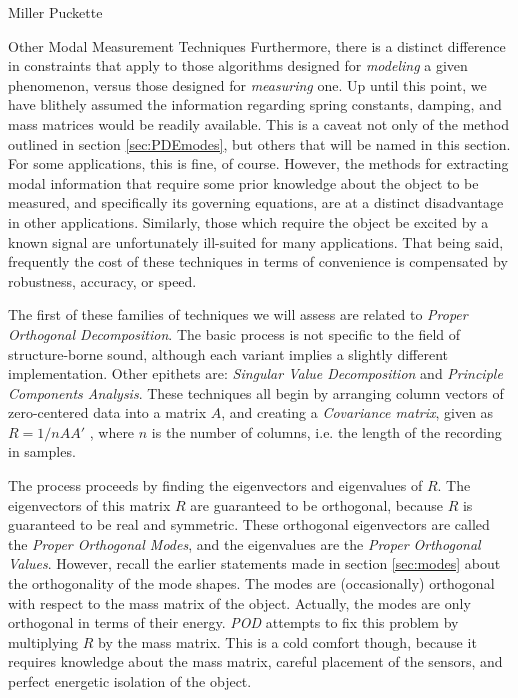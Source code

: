 \documentclass[a4paper,10pt]{report}
\numberwithin{equation}{section}
\begin{document}
\begin{chapter}{Miller Puckette}
\begin{section}{Other Modal Measurement Techniques}
Furthermore, there is a distinct difference in constraints that apply to those algorithms designed for \emph{modeling} a given phenomenon, versus those designed for \emph{measuring} one. Up until this point, we have blithely assumed the information regarding spring constants, damping, and mass matrices would be readily available. This is a caveat not only of the method outlined in section \ref{sec:PDEmodes}, but others that will be named in this section. For some applications, this is fine, of course. However, the methods for extracting modal information that require some prior knowledge about the object to be measured, and specifically its governing equations, are at a distinct disadvantage in other applications. Similarly, those which require the object be excited by a known signal are unfortunately ill-suited for many applications. That being said, frequently the cost of these techniques in terms of convenience is compensated by robustness, accuracy, or speed.

The first of these families of techniques we will assess are related to \emph{Proper Orthogonal Decomposition}. \cite{Han2003} \cite{Kerschen2002} \cite{Feeny1998} The basic process is not specific to the field of structure-borne sound, although each variant implies a slightly different implementation. Other epithets are: \emph{Singular Value Decomposition} and \emph{Principle Components Analysis}. These techniques all begin by arranging column vectors of zero-centered data into a matrix $A$, and creating a \emph{Covariance matrix}, given as $R = 1/n A A'$ , where $n$ is the number of columns, i.e. the length of the recording in samples. 

The process proceeds by finding the eigenvectors and eigenvalues of $R$. The eigenvectors of this matrix $R$ are guaranteed to be orthogonal, because $R$ is guaranteed to be real and symmetric. These orthogonal eigenvectors are called the \emph{Proper Orthogonal Modes}, and the eigenvalues are the \emph{Proper Orthogonal Values}. However, recall the earlier statements made in section \ref{sec:modes} about the orthogonality of the mode shapes. The modes are (occasionally) orthogonal with respect to the mass matrix of the object. Actually, the modes are only orthogonal in terms of their energy. \cite{Cremer1973} \emph{POD} attempts to fix this problem by multiplying $R$ by the mass matrix.\cite{Han2003} This is a cold comfort though, because it requires knowledge about the mass matrix, careful placement of the sensors, and perfect energetic isolation of the object. 


\end{section}
\end{chapter}
\end{document}
